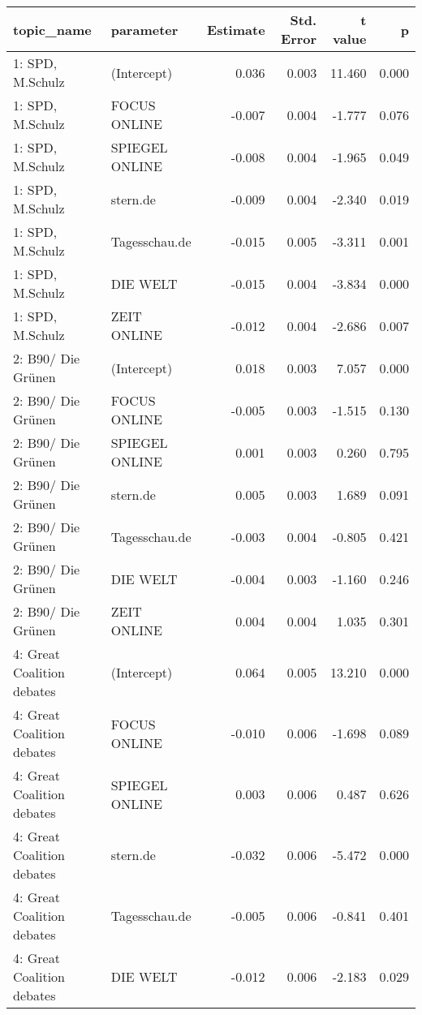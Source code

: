 \begin{adjustbox}{width=\textwidth,totalheight=\textheight,keepaspectratio}
\begin{tabular}{llrrrr}
  \hline
topic\_name & parameter & Estimate & Std. Error & t value & p \\ 
  \hline
1: SPD, M.Schulz & (Intercept) & 0.036 & 0.003 & 11.460 & 0.000 \\ 
  1: SPD, M.Schulz & FOCUS ONLINE & -0.007 & 0.004 & -1.777 & 0.076 \\ 
  1: SPD, M.Schulz & SPIEGEL ONLINE & -0.008 & 0.004 & -1.965 & 0.049 \\ 
  1: SPD, M.Schulz & stern.de & -0.009 & 0.004 & -2.340 & 0.019 \\ 
  1: SPD, M.Schulz & Tagesschau.de & -0.015 & 0.005 & -3.311 & 0.001 \\ 
  1: SPD, M.Schulz & DIE WELT & -0.015 & 0.004 & -3.834 & 0.000 \\ 
  1: SPD, M.Schulz & ZEIT ONLINE & -0.012 & 0.004 & -2.686 & 0.007 \\ 
  2: B90/ Die Grünen & (Intercept) & 0.018 & 0.003 & 7.057 & 0.000 \\ 
  2: B90/ Die Grünen & FOCUS ONLINE & -0.005 & 0.003 & -1.515 & 0.130 \\ 
  2: B90/ Die Grünen & SPIEGEL ONLINE & 0.001 & 0.003 & 0.260 & 0.795 \\ 
  2: B90/ Die Grünen & stern.de & 0.005 & 0.003 & 1.689 & 0.091 \\ 
  2: B90/ Die Grünen & Tagesschau.de & -0.003 & 0.004 & -0.805 & 0.421 \\ 
  2: B90/ Die Grünen & DIE WELT & -0.004 & 0.003 & -1.160 & 0.246 \\ 
  2: B90/ Die Grünen & ZEIT ONLINE & 0.004 & 0.004 & 1.035 & 0.301 \\ 
  4: Great Coalition debates & (Intercept) & 0.064 & 0.005 & 13.210 & 0.000 \\ 
  4: Great Coalition debates & FOCUS ONLINE & -0.010 & 0.006 & -1.698 & 0.089 \\ 
  4: Great Coalition debates & SPIEGEL ONLINE & 0.003 & 0.006 & 0.487 & 0.626 \\ 
  4: Great Coalition debates & stern.de & -0.032 & 0.006 & -5.472 & 0.000 \\ 
  4: Great Coalition debates & Tagesschau.de & -0.005 & 0.006 & -0.841 & 0.401 \\ 
  4: Great Coalition debates & DIE WELT & -0.012 & 0.006 & -2.183 & 0.029 \\ 

\end{tabular}
\end{adjustbox}
